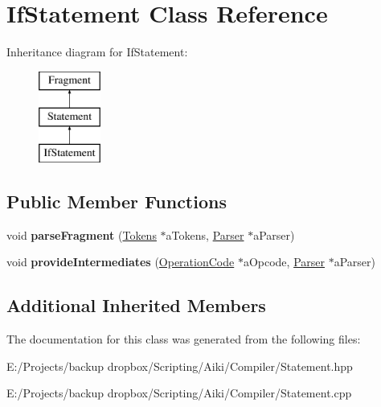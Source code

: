 \hypertarget{a00013}{\section{If\+Statement Class Reference}
\label{a00013}
}
Inheritance diagram for If\+Statement\+:\begin{figure}[H]
\begin{center}
\leavevmode
\includegraphics[height=3.000000cm]{d7/dd4/a00013}
\end{center}
\end{figure}
\subsection*{Public Member Functions}
\begin{DoxyCompactItemize}
\item 
\hypertarget{a00013_a2dcef21fb3f3d969007df235e01f6900}{void {\bfseries parse\+Fragment} (\hyperlink{a00026}{Tokens} $\ast$a\+Tokens, \hyperlink{a00017}{Parser} $\ast$a\+Parser)}\label{a00013_a2dcef21fb3f3d969007df235e01f6900}

\item 
\hypertarget{a00013_a90f085925b7ef5edce272f3294d8c047}{void {\bfseries provide\+Intermediates} (\hyperlink{a00015}{Operation\+Code} $\ast$a\+Opcode, \hyperlink{a00017}{Parser} $\ast$a\+Parser)}\label{a00013_a90f085925b7ef5edce272f3294d8c047}

\end{DoxyCompactItemize}
\subsection*{Additional Inherited Members}


The documentation for this class was generated from the following files\+:\begin{DoxyCompactItemize}
\item 
E\+:/\+Projects/backup dropbox/\+Scripting/\+Aiki/\+Compiler/Statement.\+hpp\item 
E\+:/\+Projects/backup dropbox/\+Scripting/\+Aiki/\+Compiler/Statement.\+cpp\end{DoxyCompactItemize}

